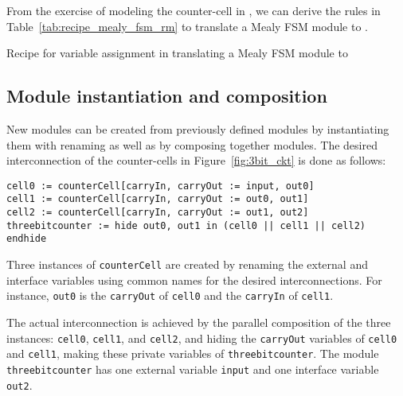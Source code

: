 From the exercise of modeling the counter-cell in \rem, we can derive
the rules in Table~\ref{tab:recipe_mealy_fsm_rm} to translate a
Mealy FSM module to \rem. 

\begin{table}
\caption{Recipe for variable assignment in translating a Mealy FSM
module to \rem}
\label{tab:recipe_mealy_fsm_rm}
\end{table}
\subsection{Module instantiation and composition}
New modules can be created from previously defined modules by
instantiating them with renaming as well as by composing together modules. The
desired interconnection of the counter-cells in Figure~\ref{fig:3bit_ckt} is done as follows: 


\begin{verbatim}
cell0 := counterCell[carryIn, carryOut := input, out0]
cell1 := counterCell[carryIn, carryOut := out0, out1]
cell2 := counterCell[carryIn, carryOut := out1, out2]
threebitcounter := hide out0, out1 in (cell0 || cell1 || cell2) endhide
\end{verbatim}

Three instances of {\tt counterCell} are created by renaming the
external and interface variables using common names for the desired
interconnections. For instance, {\tt out0} is the {\tt carryOut} of
{\tt cell0} and the {\tt carryIn} of {\tt cell1}. 

The actual interconnection is achieved by the parallel composition of
the three instances: {\tt cell0}, {\tt cell1}, and {\tt cell2}, and
hiding the {\tt carryOut} variables of {\tt cell0} and {\tt cell1},
making these private variables of {\tt threebitcounter}. The module \\
{\tt threebitcounter} has one external variable {\tt input} and one
interface variable {\tt out2}. 

